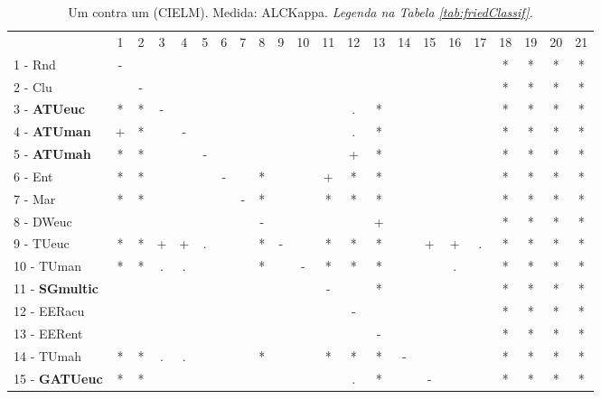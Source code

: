 \begin{table}[h]
\caption{Um contra um (CIELM). Medida: ALCKappa. \textit{Legenda na Tabela \ref{tab:friedClassif}.}}
\begin{center}\begin{tabular}{lcc|cc|cc|cc|cc|cc|cc|cc|cc|cc|c}
 			& 1 & 2 & 3 & 4 & 5 & 6 & 7 & 8 & 9 & 10 & 11 & 12 & 13 & 14 & 15 & 16 & 17 & 18 & 19 & 20 & 21\\
1 - Rnd  	& - &   &   &   &   &   &   &   &   &   &   &   &   &   &   &   &   & * & * & * & * \\
2 - Clu  	&   & - &   &   &   &   &   &   &   &   &   &   &   &   &   &   &   & * & * & * & * \\ \hline
3 - \textbf{ATUeuc}	& * & * & - &   &   &   &   &   &   &   &   & . & * &   &   &   &   & * & * & * & * \\
4 - \textbf{ATUman}	& + & * &   & - &   &   &   &   &   &   &   & . & * &   &   &   &   & * & * & * & * \\ \hline
5 - \textbf{ATUmah}	& * & * &   &   & - &   &   &   &   &   &   & + & * &   &   &   &   & * & * & * & * \\
6 - Ent  	& * & * &   &   &   & - &   & * &   &   & + & * & * &   &   &   &   & * & * & * & * \\ \hline
7 - Mar  	& * & * &   &   &   &   & - & * &   &   & * & * & * &   &   &   &   & * & * & * & * \\
8 - DWeuc	&   &   &   &   &   &   &   & - &   &   &   &   & + &   &   &   &   & * & * & * & * \\ \hline
9 - TUeuc	& * & * & + & + & . &   &   & * & - &   & * & * & * &   & + & + & . & * & * & * & * \\
10 - TUman	& * & * & . & . &   &   &   & * &   & - & * & * & * &   &   & . &   & * & * & * & * \\ \hline
11 - \textbf{SGmultic}	&   &   &   &   &   &   &   &   &   &   & - &   & * &   &   &   &   & * & * & * & * \\
12 - EERacu	&   &   &   &   &   &   &   &   &   &   &   & - &   &   &   &   &   & * & * & * & * \\ \hline
13 - EERent	&   &   &   &   &   &   &   &   &   &   &   &   & - &   &   &   &   & * & * & * & * \\
14 - TUmah	& * & * & . & . &   &   &   & * &   &   & * & * & * & - &   &   &   & * & * & * & * \\ \hline
15 - \textbf{GATUeuc}	& * & * &   &   &   &   &   &   &   &   &   & . & * &   & - &   &   & * & * & * & * \\

\end{tabular}
\end{center}
\end{table}
